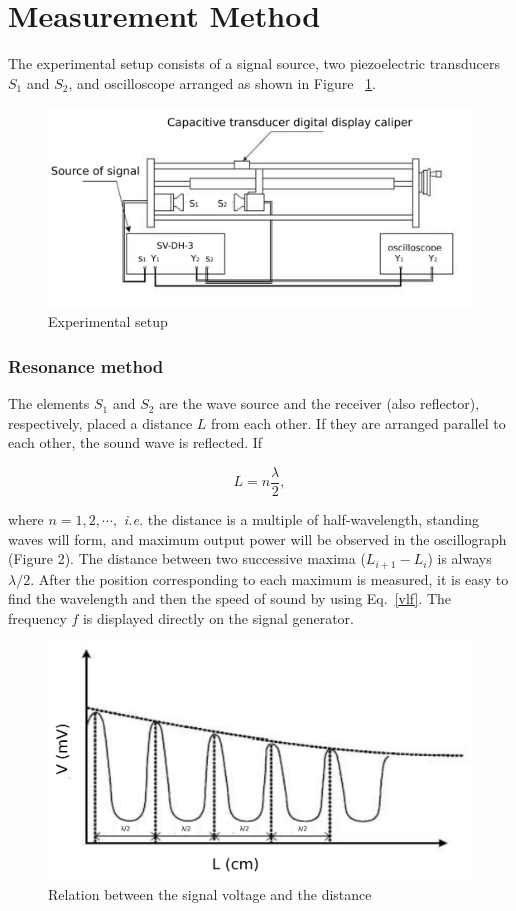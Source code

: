 \section{Measurement Method}

The experimental setup consists of a signal source, two piezoelectric
transducers $S_1$ and $S_2$, and oscilloscope arranged as shown in Figure~
\ref{app}.

\begin{figure}[H]
    \centering
    \includegraphics[width=12cm]{fig/es1}
    \caption{Experimental setup}\label{app}
\end{figure}


\subsubsection{Resonance method}

The elements $S_1$ and $S_2$ are the wave source and the receiver (also
reflector), respectively, placed a distance $L$ from each other. If they are
arranged parallel to each other, the sound wave is reflected. If 

\begin{equation}
    L=n\frac{\lambda}{2},
    \label{equ_res}
\end{equation}

where $n=1,2,\cdots,$ \emph{i.e.} the distance is a multiple of
half-wavelength, standing waves will form, and maximum output power will be
observed in the oscillograph (Figure 2). The distance between two successive
maxima ($L_{i+1} - L_i$) is always $\lambda/2$. After the position
corresponding to each maximum is measured, it is easy to find the wavelength
and then the speed of sound by using Eq.~\ref{vlf}. The frequency $f$ is
displayed directly on the signal generator. 

\begin{figure}[H]
    \centering
    \includegraphics[width=12cm]{fig/r}
    \caption{Relation between the signal voltage and the distance}\label{vL}
\end{figure}

